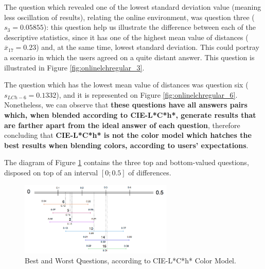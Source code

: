 %
The question which revealed one of the lowest standard deviation value (meaning less oscillation of results), relating the online environment, was question three ($s_{3} = 0.05855$): this question help us
illustrate the difference between each of the descriptive statistics, since it has one of the highest mean value of distances ($\overline{x}_{17} = 0.23$) and, at the same time, lowest standard deviation. This could
portray a scenario in which the users agreed on a quite distant answer. This question is illustrated in Figure \ref{fig:onlinelchregular_3}. \par
%
The question which has the lowest mean value of distances was question six ($s_{LCh-6} = 0.1332$), and it is represented on Figure \ref{fig:onlinelchregular_6}. Nonetheless, we can observe that \textbf{these
questions have all answers pairs which, when blended according to CIE-L*C*h*, generate results that are farther apart from the ideal answer of each question}, therefore concluding that \textbf{CIE-L*C*h* is not
the color model which hatches the best results when blending colors, according to users' expectations}. \par
%
The diagram of Figure \ref{fig:lch_analysis} contains the three top and bottom-valued questions, disposed on top of an interval $[0 ; 0.5]$ of differences.
%
\begin{figure}[!htbp]
  \centering
  \vspace{-10pt}
  \includegraphics[width=0.65\textwidth]{images/results/lch_questions_analysis.png}
  \caption[Best and Worst Questions, according to CIE-L*C*h* Color Model.]{Best and Worst Questions, according to CIE-L*C*h* Color Model.}
  \vspace{-5pt}
  \label{fig:lch_analysis}
\end{figure}
%
%
